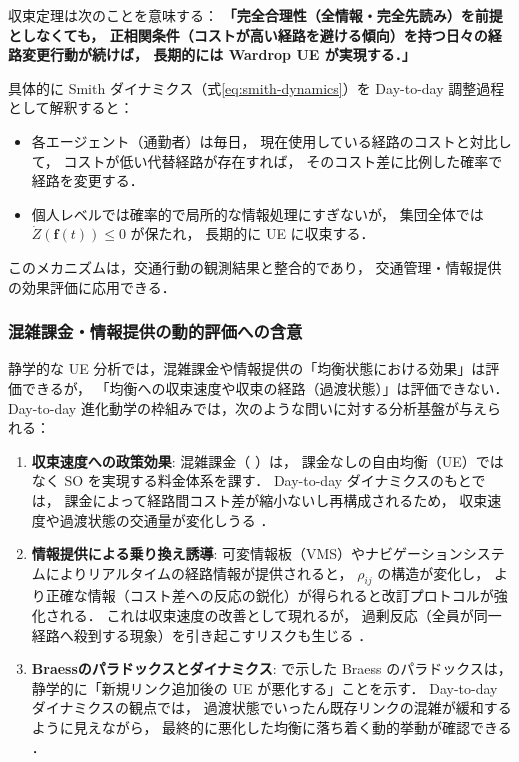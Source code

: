 収束定理は次のことを意味する：
\textbf{「完全合理性（全情報・完全先読み）を前提としなくても，
正相関条件（コストが高い経路を避ける傾向）を持つ日々の経路変更行動が続けば，
長期的には Wardrop UE が実現する．」}

具体的に Smith ダイナミクス（式\eqref{eq:smith-dynamics}）を
Day-to-day 調整過程として解釈すると：

\begin{itemize}
  \item 各エージェント（通勤者）は毎日，
        現在使用している経路のコストと対比して，
        コストが低い代替経路が存在すれば，
        そのコスト差に比例した確率で経路を変更する．
  \item 個人レベルでは確率的で局所的な情報処理にすぎないが，
        集団全体では $\dot{Z}(\boldsymbol{f}(t)) \leq 0$ が保たれ，
        長期的に UE に収束する．
\end{itemize}

このメカニズムは，交通行動の観測結果と整合的であり，
交通管理・情報提供の効果評価に応用できる．

\subsubsection*{混雑課金・情報提供の動的評価への含意}

静学的な UE 分析では，混雑課金や情報提供の「均衡状態における効果」は評価できるが，
「均衡への収束速度や収束の経路（過渡状態）」は評価できない．
Day-to-day 進化動学の枠組みでは，次のような問いに対する分析基盤が与えられる：

\begin{enumerate}
  \item \textbf{収束速度への政策効果}:
        混雑課金（ ）は，
        課金なしの自由均衡（UE）ではなく SO を実現する料金体系を課す．
        Day-to-day ダイナミクスのもとでは，
        課金によって経路間コスト差が縮小ないし再構成されるため，
        収束速度や過渡状態の交通量が変化しうる
        \cite{赤松1996}．

  \item \textbf{情報提供による乗り換え誘導}:
        可変情報板（VMS）やナビゲーションシステムによりリアルタイムの経路情報が提供されると，
        $\rho_{ij}$ の構造が変化し，
        より正確な情報（コスト差への反応の鋭化）が得られると改訂プロトコルが強化される．
        これは収束速度の改善として現れるが，
        過剰反応（全員が同一経路へ殺到する現象）を引き起こすリスクも生じる
        \cite{Sandholm2010}．

  \item \textbf{Braessのパラドックスとダイナミクス}:
        で示した Braess のパラドックスは，
        静学的に「新規リンク追加後の UE が悪化する」ことを示す．
        Day-to-day ダイナミクスの観点では，
        過渡状態でいったん既存リンクの混雑が緩和するように見えながら，
        最終的に悪化した均衡に落ち着く動的挙動が確認できる
        \cite{Sandholm2010,Braess1968}．
\end{enumerate}

